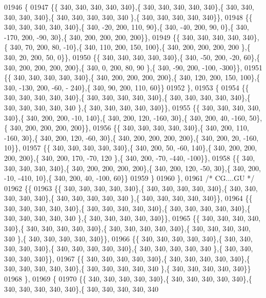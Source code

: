 \begin{DoxyCode}
01946 \{
01947 \{\{ 340, 340, 340, 340, 340\},\{ 340, 340, 340, 340, 340\},\{ 340, 340, 340, 340, 340\},\{ 340, 340, 340, 340, 340
      \},\{ 340, 340, 340, 340, 340\}\},
01948 \{\{ 340, 340, 340, 340, 340\},\{ 340, -20, 200, 110,  90\},\{ 340, -40, 200,  90,   0\},\{ 340, -170, 200, -90,  
      30\},\{ 340, 200, 200, 200, 200\}\},
01949 \{\{ 340, 340, 340, 340, 340\},\{ 340,  70, 200,  80, -10\},\{ 340, 110, 200, 150, 100\},\{ 340, 200, 200, 200, 200
      \},\{ 340,  20, 200,  50,   0\}\},
01950 \{\{ 340, 340, 340, 340, 340\},\{ 340, -50, 200, -20,  60\},\{ 340, 200, 200, 200, 200\},\{ 340,   0, 200,  80,  90
      \},\{ 340, -90, 200, -100, -300\}\},
01951 \{\{ 340, 340, 340, 340, 340\},\{ 340, 200, 200, 200, 200\},\{ 340, 120, 200, 150, 100\},\{ 340, -130, 200, -60, -
      240\},\{ 340,  90, 200, 110,  60\}\}
01952 \},
01953 \{
01954 \{\{ 340, 340, 340, 340, 340\},\{ 340, 340, 340, 340, 340\},\{ 340, 340, 340, 340, 340\},\{ 340, 340, 340, 340, 340
      \},\{ 340, 340, 340, 340, 340\}\},
01955 \{\{ 340, 340, 340, 340, 340\},\{ 340, 200, 200, -10, 140\},\{ 340, 200, 120, -160,  30\},\{ 340, 200,  40, -160,  
      50\},\{ 340, 200, 200, 200, 200\}\},
01956 \{\{ 340, 340, 340, 340, 340\},\{ 340, 200, 110, -160,  30\},\{ 340, 200, 120, -60,  30\},\{ 340, 200, 200, 200, 
      200\},\{ 340, 200,  20, -160,  10\}\},
01957 \{\{ 340, 340, 340, 340, 340\},\{ 340, 200,  50, -60, 140\},\{ 340, 200, 200, 200, 200\},\{ 340, 200, 170, -70, 120
      \},\{ 340, 200, -70, -440, -100\}\},
01958 \{\{ 340, 340, 340, 340, 340\},\{ 340, 200, 200, 200, 200\},\{ 340, 200, 120, -50,  30\},\{ 340, 200, -10, -410,  
      10\},\{ 340, 200,  40, -100,  60\}\}
01959 \}
01960 \},
01961 \textcolor{comment}{/* CG....GU */}
01962 \{\{
01963 \{\{ 340, 340, 340, 340, 340\},\{ 340, 340, 340, 340, 340\},\{ 340, 340, 340, 340, 340\},\{ 340, 340, 340, 340, 340
      \},\{ 340, 340, 340, 340, 340\}\},
01964 \{\{ 340, 340, 340, 340, 340\},\{ 340, 340, 340, 340, 340\},\{ 340, 340, 340, 340, 340\},\{ 340, 340, 340, 340, 340
      \},\{ 340, 340, 340, 340, 340\}\},
01965 \{\{ 340, 340, 340, 340, 340\},\{ 340, 340, 340, 340, 340\},\{ 340, 340, 340, 340, 340\},\{ 340, 340, 340, 340, 340
      \},\{ 340, 340, 340, 340, 340\}\},
01966 \{\{ 340, 340, 340, 340, 340\},\{ 340, 340, 340, 340, 340\},\{ 340, 340, 340, 340, 340\},\{ 340, 340, 340, 340, 340
      \},\{ 340, 340, 340, 340, 340\}\},
01967 \{\{ 340, 340, 340, 340, 340\},\{ 340, 340, 340, 340, 340\},\{ 340, 340, 340, 340, 340\},\{ 340, 340, 340, 340, 340
      \},\{ 340, 340, 340, 340, 340\}\}
01968 \},
01969 \{
01970 \{\{ 340, 340, 340, 340, 340\},\{ 340, 340, 340, 340, 340\},\{ 340, 340, 340, 340, 340\},\{ 340, 340, 340, 340, 340

\end{DoxyCode}
